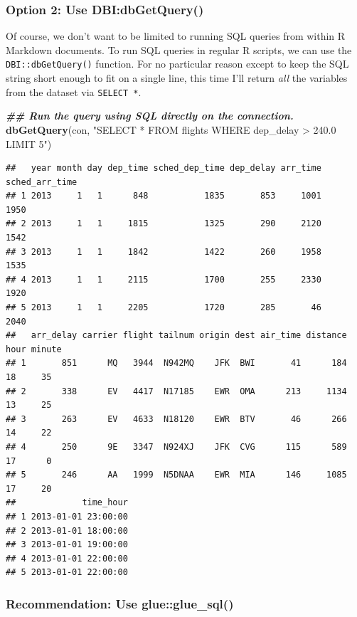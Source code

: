 \documentclass[
]{article}
\newenvironment{Shaded}{\begin{snugshade}}{\end{snugshade}}
\newcommand{\DocumentationTok}[1]{\textcolor[rgb]{0.56,0.35,0.01}{\textbf{\textit{#1}}}}
\newcommand{\FunctionTok}[1]{\textcolor[rgb]{0.13,0.29,0.53}{\textbf{#1}}}
\newcommand{\NormalTok}[1]{#1}
\newcommand{\StringTok}[1]{\textcolor[rgb]{0.31,0.60,0.02}{#1}}
\begin{document}
\hypertarget{option-2-use-dbidbgetquery}{%
\subsubsection{Option 2: Use
DBI:dbGetQuery()}\label{option-2-use-dbidbgetquery}}

Of course, we don't want to be limited to running SQL queries from
within R Markdown documents. To run SQL queries in regular R scripts, we
can use the \texttt{DBI::dbGetQuery()} function. For no particular
reason except to keep the SQL string short enough to fit on a single
line, this time I'll return \emph{all} the variables from the dataset
via \texttt{SELECT\ *}.

\begin{Shaded}
\begin{Highlighting}[]
\DocumentationTok{\#\# Run the query using SQL directly on the connection.}
\FunctionTok{dbGetQuery}\NormalTok{(con, }\StringTok{"SELECT * FROM flights WHERE dep\_delay \textgreater{} 240.0 LIMIT 5"}\NormalTok{)}
\end{Highlighting}
\end{Shaded}

\begin{verbatim}
##   year month day dep_time sched_dep_time dep_delay arr_time sched_arr_time
## 1 2013     1   1      848           1835       853     1001           1950
## 2 2013     1   1     1815           1325       290     2120           1542
## 3 2013     1   1     1842           1422       260     1958           1535
## 4 2013     1   1     2115           1700       255     2330           1920
## 5 2013     1   1     2205           1720       285       46           2040
##   arr_delay carrier flight tailnum origin dest air_time distance hour minute
## 1       851      MQ   3944  N942MQ    JFK  BWI       41      184   18     35
## 2       338      EV   4417  N17185    EWR  OMA      213     1134   13     25
## 3       263      EV   4633  N18120    EWR  BTV       46      266   14     22
## 4       250      9E   3347  N924XJ    JFK  CVG      115      589   17      0
## 5       246      AA   1999  N5DNAA    EWR  MIA      146     1085   17     20
##             time_hour
## 1 2013-01-01 23:00:00
## 2 2013-01-01 18:00:00
## 3 2013-01-01 19:00:00
## 4 2013-01-01 22:00:00
## 5 2013-01-01 22:00:00
\end{verbatim}

\hypertarget{recommendation-use-glueglue_sql}{%
\subsubsection{Recommendation: Use
glue::glue\_sql()}\label{recommendation-use-glueglue_sql}}
\end{document}

